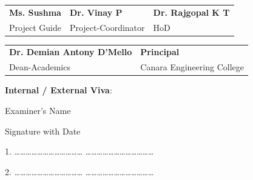 \documentclass[12pt,a4paper]{report}
\begin{document}
\par
\vspace{0.35in}

\begin{tabularx}{0.98 \textwidth} { 
   >{\raggedright\arraybackslash}X 
   >{\centering\arraybackslash}X
   >{\raggedleft\arraybackslash}X }
     \textbf{Ms. Sushma} & \textbf{Dr. Vinay P} & \textbf{Dr. Rajgopal K T} \\
     Project Guide & Project-Coordinator & HoD \\
\end{tabularx}

\par
\vspace{0.3in}

\begin{tabularx}{0.98 \textwidth} {  
   >{\raggedright\arraybackslash}X 
   >{\raggedleft\arraybackslash}X}
    \textbf{Dr. Demian Antony D'Mello} & \textbf{Principal} \\
    Dean-Academics  & Canara Engineering College \\
\end{tabularx}

\vspace{0.2in}
\begin{center}
\large \textbf{Internal / External Viva}:
\end{center}
\begin{flushleft}
\begin{normalsize}Examiner's Name \end{normalsize}
\hspace{7.5cm}
\begin{normalsize}Signature with Date\end{normalsize}
\end{flushleft}

\begin{flushleft}
1. \ldots\ldots\ldots\ldots\ldots\ldots\ldots\ldots\ldots\ldots\ldots\ldots \hspace{4.2cm} \ldots\ldots\ldots\ldots\ldots\ldots\ldots\ldots\ldots\ldots\ldots\ldots 
\par
\vspace{0.15in}	
2. \ldots\ldots\ldots\ldots\ldots\ldots\ldots\ldots\ldots\ldots\ldots\ldots \hspace{4.2cm} \ldots\ldots\ldots\ldots\ldots\ldots\ldots\ldots\ldots\ldots\ldots\ldots 
\end{flushleft}
\newpage
\end{document}
